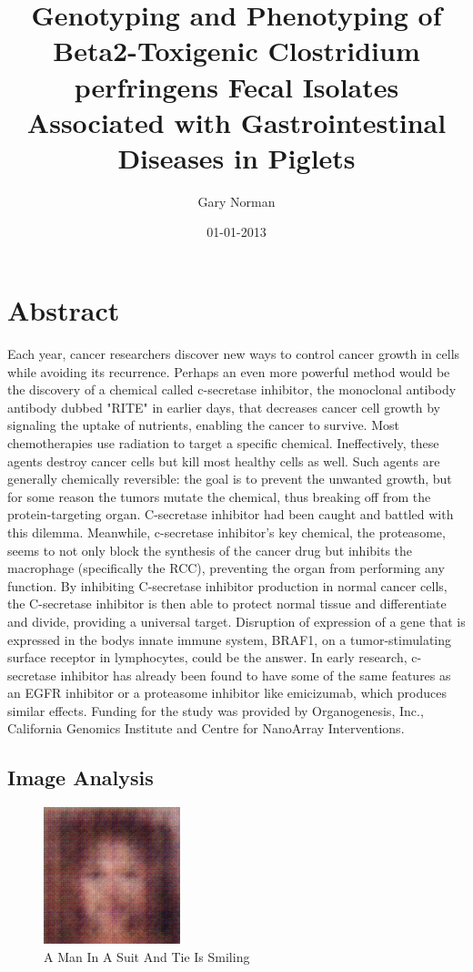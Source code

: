 \documentclass{article}%
\title{Genotyping and Phenotyping of Beta2{-}Toxigenic Clostridium perfringens Fecal Isolates Associated with Gastrointestinal Diseases in Piglets}%
\author{Gary Norman}%
\affil{Blood Transfusion Centre of Slovenia, Ljubljana, Slovenia}%
\date{01{-}01{-}2013}%
\begin{document}
%
\normalsize%
\maketitle%
\section{Abstract}%
\label{sec:Abstract}%
Each year, cancer researchers discover new ways to control cancer growth in cells while avoiding its recurrence. Perhaps an even more powerful method would be the discovery of a chemical called c{-}secretase inhibitor, the monoclonal antibody antibody dubbed "RITE" in earlier days, that decreases cancer cell growth by signaling the uptake of nutrients, enabling the cancer to survive.\newline%
Most chemotherapies use radiation to target a specific chemical. Ineffectively, these agents destroy cancer cells but kill most healthy cells as well. Such agents are generally chemically reversible: the goal is to prevent the unwanted growth, but for some reason the tumors mutate the chemical, thus breaking off from the protein{-}targeting organ. C{-}secretase inhibitor had been caught and battled with this dilemma.\newline%
Meanwhile, c{-}secretase inhibitor's key chemical, the proteasome, seems to not only block the synthesis of the cancer drug but inhibits the macrophage (specifically the RCC), preventing the organ from performing any function. By inhibiting C{-}secretase inhibitor production in normal cancer cells, the C{-}secretase inhibitor is then able to protect normal tissue and differentiate and divide, providing a universal target.\newline%
Disruption of expression of a gene that is expressed in the bodys innate immune system, BRAF1, on a tumor{-}stimulating surface receptor in lymphocytes, could be the answer.\newline%
In early research, c{-}secretase inhibitor has already been found to have some of the same features as an EGFR inhibitor or a proteasome inhibitor like emicizumab, which produces similar effects.\newline%
Funding for the study was provided by Organogenesis, Inc., California Genomics Institute and Centre for NanoArray Interventions.

%
\subsection{Image Analysis}%
\label{subsec:ImageAnalysis}%


\begin{figure}[h!]%
\centering%
\includegraphics[width=150px]{500_fake_images/samples_5_394.png}%
\caption{A Man In A Suit And Tie Is Smiling}%
\end{figure}

%
\end{document}
